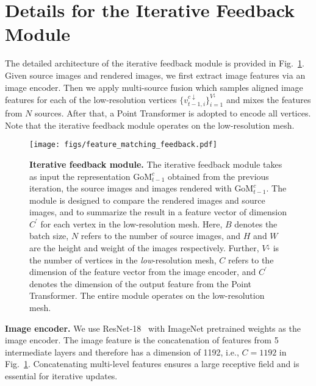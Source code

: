 \section{Details for the Iterative Feedback Module}
\label{sec: appendix_arch}

The detailed architecture of the iterative feedback module is provided in Fig.~\ref{fig: feature_matching_feedback_module}. Given  source images and rendered images, we first extract  image features via an image encoder. Then we apply multi-source fusion which samples  aligned image features for each of the low-resolution vertices $\{v_{t-1, i}^{c\downarrow}\}_{i=1}^{V^\downarrow}$ and mixes the features from $N$ sources. After that, a Point Transformer is adopted to encode all vertices. Note that the iterative feedback module operates on the low-resolution mesh.

\begin{figure}[t]
    \centering
    \texttt{[image: figs/feature\_matching\_feedback.pdf]}
    \caption{\textbf{Iterative feedback  module.} The iterative feedback module takes as input the representation $\text{GoM}_{t-1}^c$ obtained from the previous iteration, the source images and images rendered with $\text{GoM}_{t-1}^c$. The module is designed to compare the rendered images and source images, and to summarize the result in a feature vector of dimension $C^\prime$ for each vertex in the low-resolution mesh. Here, $B$ denotes the batch size, $N$ refers to the number of source images, and $H$ and $W$ are the height and weight of the images respectively. Further, $V^\downarrow$ is the number of vertices in the \textit{low}-resolution mesh, $C$ refers to the dimension of the feature vector from the image encoder, and $C^\prime$ denotes the dimension of the output feature from the Point Transformer. The entire module operates on the low-resolution mesh.}
    \label{fig: feature_matching_feedback_module}
\end{figure}

\textbf{Image encoder.} We use ResNet-18~\citep{he2016deep} with ImageNet pretrained weights as the image encoder. The image feature is the concatenation of features from 5 intermediate layers and therefore has a dimension of 1192, i.e., $C=1192$ in Fig.~\ref{fig: feature_matching_feedback_module}. Concatenating multi-level features ensures a large receptive field and is essential for iterative updates.

